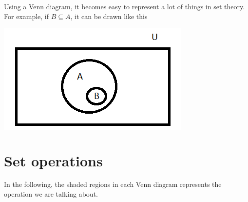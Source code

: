 \documentclass[12pt]{article}
\begin{document}
Using a Venn diagram, it becomes easy to represent a lot of things in set theory. For example, if $B \subseteq A$, it can be drawn like this

\includegraphics{./img/SubsetVenn.png}

\section*{Set operations}
In the following, the shaded regions in each Venn diagram represents the operation we are talking about.
\end{document}
